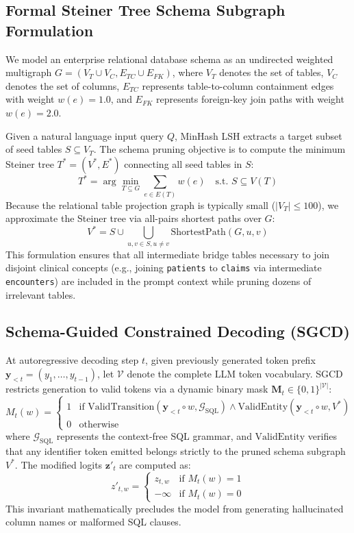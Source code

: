 \documentclass[10pt,journal,compsoc]{IEEEtran}
\begin{document}
\subsection{Formal Steiner Tree Schema Subgraph Formulation}
We model an enterprise relational database schema as an undirected weighted multigraph $G = (V_T \cup V_C, E_{TC} \cup E_{FK})$, where $V_T$ denotes the set of tables, $V_C$ denotes the set of columns, $E_{TC}$ represents table-to-column containment edges with weight $w(e) = 1.0$, and $E_{FK}$ represents foreign-key join paths with weight $w(e) = 2.0$.

Given a natural language input query $Q$, MinHash LSH extracts a target subset of seed tables $S \subseteq V_T$. The schema pruning objective is to compute the minimum Steiner tree $T^* = (V^*, E^*)$ connecting all seed tables in $S$:
\begin{equation}
T^* = \arg\min_{T \subseteq G} \sum_{e \in E(T)} w(e) \quad \text{s.t. } S \subseteq V(T)
\end{equation}
Because the relational table projection graph is typically small ($|V_T| \le 100$), we approximate the Steiner tree via all-pairs shortest paths over $G$:
\begin{equation}
V^* = S \cup \bigcup_{u, v \in S, u \neq v} \text{ShortestPath}(G, u, v)
\end{equation}
This formulation ensures that all intermediate bridge tables necessary to join disjoint clinical concepts (e.g., joining \texttt{patients} to \texttt{claims} via intermediate \texttt{encounters}) are included in the prompt context while pruning dozens of irrelevant tables.

\subsection{Schema-Guided Constrained Decoding (SGCD)}
At autoregressive decoding step $t$, given previously generated token prefix $\mathbf{y}_{<t} = (y_1, \dots, y_{t-1})$, let $\mathcal{V}$ denote the complete LLM token vocabulary. SGCD restricts generation to valid tokens via a dynamic binary mask $\mathbf{M}_t \in \{0, 1\}^{|\mathcal{V}|}$:
\begin{equation}
M_t(w) = \begin{cases}
1 & \text{if } \text{ValidTransition}(\mathbf{y}_{<t} \circ w, \mathcal{G}_{\text{SQL}}) \land \text{ValidEntity}(\mathbf{y}_{<t} \circ w, V^*) \\
0 & \text{otherwise}
\end{cases}
\end{equation}
where $\mathcal{G}_{\text{SQL}}$ represents the context-free SQL grammar, and $\text{ValidEntity}$ verifies that any identifier token emitted belongs strictly to the pruned schema subgraph $V^*$. The modified logits $\mathbf{z}'_t$ are computed as:
\begin{equation}
z'_{t, w} = \begin{cases}
z_{t, w} & \text{if } M_t(w) = 1 \\
-\infty & \text{if } M_t(w) = 0
\end{cases}
\end{equation}
This invariant mathematically precludes the model from generating hallucinated column names or malformed SQL clauses.
\end{document}
